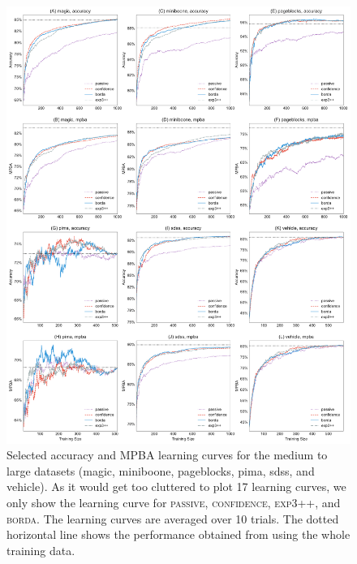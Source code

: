 \documentclass[fleqn,10pt,lineno]{wlpeerj} %
\begin{document}
\begin{figure}[tbp]
	\centering
	\includegraphics[width=\textwidth]{Fig9}
	\caption[Selected learning curves]{Selected accuracy and MPBA learning
	curves for the medium to large datasets (magic, miniboone, pageblocks,
	pima, sdss, and vehicle). As it would get too cluttered to plot 17 learning
	curves, we only show the learning curve for \textsc{passive},
	\textsc{confidence}, \textsc{exp3++}, and \textsc{borda}. The learning
	curves are averaged over 10 trials. The dotted horizontal line shows the
	performance obtained from using the whole training data.}
	\label{fig:learning_curves-large}
\end{figure}
\end{document}
